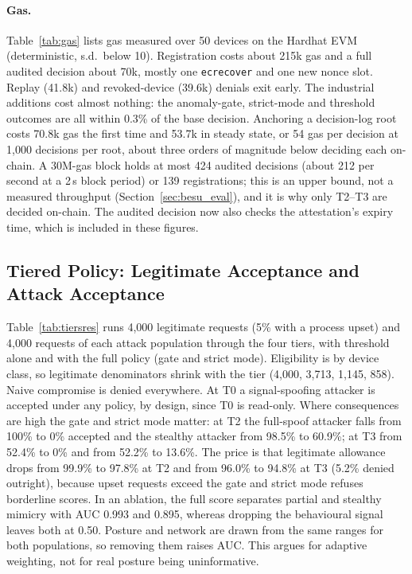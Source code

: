 \paragraph{Gas.}\label{sec:gas} Table~\ref{tab:gas} lists gas measured over 50 devices on the Hardhat EVM (deterministic, s.d.\ below 10). Registration costs about 215k gas and a full audited decision about 70k, mostly one \texttt{ecrecover} and one new nonce slot. Replay (41.8k) and revoked-device (39.6k) denials exit early. The industrial additions cost almost nothing: the anomaly-gate, strict-mode and threshold outcomes are all within 0.3\% of the base decision. Anchoring a decision-log root costs 70.8k gas the first time and 53.7k in steady state, or 54 gas per decision at 1{,}000 decisions per root, about three orders of magnitude below deciding each on-chain. A 30M-gas block holds at most 424 audited decisions (about 212 per second at a 2\,s block period) or 139 registrations; this is an upper bound, not a measured throughput (Section~\ref{sec:besu_eval}), and it is why only T2--T3 are decided on-chain. The audited decision now also checks the attestation's expiry time, which is included in these figures.

\begin{table}[t]
\centering
\caption{Measured gas per operation (Hardhat EVM, solc 0.8.24, 50 devices)}
\label{tab:gas}
\scriptsize

\end{table}

\subsection{Tiered Policy: Legitimate Acceptance and Attack Acceptance}\label{sec:tiers_eval}
Table~\ref{tab:tiersres} runs 4{,}000 legitimate requests (5\% with a process upset) and 4{,}000 requests of each attack population through the four tiers, with threshold alone and with the full policy (gate and strict mode). Eligibility is by device class, so legitimate denominators shrink with the tier (4{,}000, 3{,}713, 1{,}145, 858). Naive compromise is denied everywhere. At T0 a signal-spoofing attacker is accepted under any policy, by design, since T0 is read-only. Where consequences are high the gate and strict mode matter: at T2 the full-spoof attacker falls from 100\% to 0\% accepted and the stealthy attacker from 98.5\% to 60.9\%; at T3 from 52.4\% to 0\% and from 52.2\% to 13.6\%. The price is that legitimate allowance drops from 99.9\% to 97.8\% at T2 and from 96.0\% to 94.8\% at T3 (5.2\% denied outright), because upset requests exceed the gate and strict mode refuses borderline scores. In an ablation, the full score separates partial and stealthy mimicry with AUC 0.993 and 0.895, whereas dropping the behavioural signal leaves both at 0.50. Posture and network are drawn from the same ranges for both populations, so removing them raises AUC. This argues for adaptive weighting, not for real posture being uninformative.

